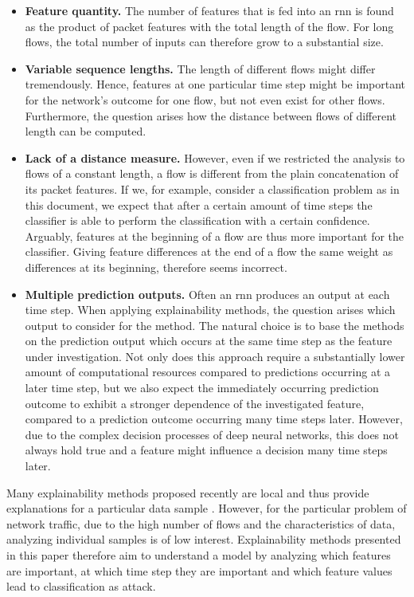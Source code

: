 \documentclass[conference]{IEEEtran}
\begin{document}
\begin{itemize}[topsep=0pt,wide,labelwidth=!,labelindent=0pt]
\item
\textbf{Feature quantity.}
The number of features that is fed into an \gls{rnn} is found as the product of packet features with the total length of the flow. For long flows, the total number of inputs can therefore grow to a substantial size.

\item
\textbf{Variable sequence lengths.}
The length of different flows might differ tremendously. Hence, features at one particular time step might be important for the network's outcome for one flow, but not even exist for other flows. Furthermore, the question arises how the distance between flows of different length can be computed.

\item
\textbf{Lack of a distance measure.}
However, even if we restricted the analysis to flows of a constant length, a flow is different from the plain concatenation of its packet features.
If we, for example, consider a classification problem as in this document, we expect that after a certain amount of time steps the classifier is able to perform the classification with a certain confidence. Arguably, features at the beginning of a flow are thus more important for the classifier. Giving feature differences at the end of a flow the same weight as differences at its beginning, therefore seems incorrect.

\item
\textbf{Multiple prediction outputs.}
Often an \gls{rnn} produces an output at each time step. When  applying explainability methods, the question arises which output to consider for the method. The natural choice is to base the methods on the prediction output which occurs at the same time step as the feature under investigation. Not only does this approach require a substantially lower amount of computational resources compared to predictions occurring at a later time step, but we also expect the immediately occurring prediction outcome to exhibit a stronger dependence of the investigated feature, compared to a prediction outcome occurring many time steps later.
However, due to the complex decision processes of deep neural networks,
this does not always hold true and a feature might influence a decision many time steps later.
\end{itemize}

Many explainability methods proposed recently are local and thus provide explanations for a particular data sample \cite{shapley_value_1953,lundberg_unified_2017,dhurandhar_model_2018,ribeiro_why_2016}. However, for the particular problem of network traffic, due to the high number of flows and the characteristics of data, analyzing individual samples is of low interest. Explainability methods presented in this paper therefore aim to understand a model by analyzing which features are important, at which time step they are important and which feature values lead to classification as attack.
\end{document}
